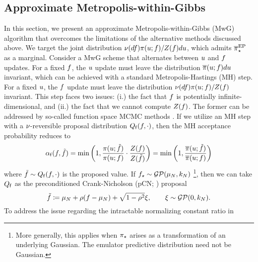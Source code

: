 \documentclass[12pt]{article}
\begin{document}
\subsection{Approximate Metropolis-within-Gibbs}
In this section, we present an approximate Metropolis-within-Gibbs (MwG) algorithm that 
overcomes the limitations of the alternative methods discussed above. We 
target the joint distribution 
$\nu(df) \pi(u; f)/Z(f) du$, which admits
${\overline{\pi}}_{\star}^{\mathrm{EP}}$ as a marginal. Consider a MwG
scheme that alternates between $u$ and $f$ updates. 
For a fixed $f$, the $u$ update must leave the distribution 
$\overline{\pi}(u; f) du$ invariant, which can be achieved 
with a standard Metropolis-Hastings (MH) step. For a fixed $u$, the $f$
update must leave the distribution 
$\nu(df) \pi(u; f)/Z(f)$
invariant. This step faces two issues: (i.) the fact that $f$ is potentially 
infinite-dimensional, and (ii.) the fact that we cannot compute 
$Z(f)$. The former can be addressed by so-called 
function space MCMC methods \citep{functionSpaceMCMC}. If we utilize an
MH step with a $\nu$-reversible proposal distribution 
$Q_{\mathsf{f}}(f, \cdot)$, then the MH acceptance probability reduces to
\begin{equation}
\alpha_{\mathsf{f}}(f, \tilde{f})
= \min\left(1, \frac{\pi(u; \tilde{f})}{\pi(u; f)} \cdot 
\frac{Z(f)}{Z(\tilde{f})} \right)
= \min\left(1, \frac{\overline{\pi}(u; \tilde{f})}{\overline{\pi}(u; f)} \right)
\label{eq:MH-ratio-mwg}
\end{equation}
where $\tilde{f} \sim Q_{\mathsf{f}}(f, \cdot)$ is the proposed value.
If ${f}_{\star} \sim \mathcal{GP}(\mu_{N}, k_{N})$
\footnote{More generally, this applies when ${\pi}_{\star}$ arises as a transformation
of an underlying Gaussian. The emulator predictive distribution need not be Gaussian.}, 
then we can take $Q_{\mathsf{f}}$ as
the preconditioned Crank-Nicholson (pCN; \citet{functionSpaceMCMC}) proposal
\begin{equation}
\tilde{f} \coloneqq \mu_{N} + \rho (f  - \mu_{N}) + \sqrt{1 - \rho^2} \xi, 
\qquad \xi \sim \mathcal{GP}(0, k_{N}).
\end{equation}
To address the issue regarding the intractable normalizing constant ratio in 
\end{document}
